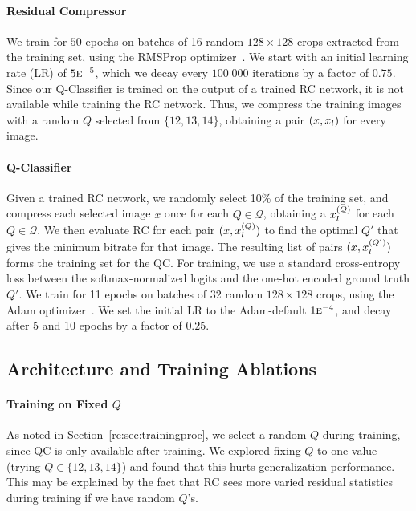 \paragraph{Residual Compressor}
We train for $50$ epochs on batches of 16 random $128{\times}128$ crops extracted from the training set, using the \mbox{RMSProp} optimizer~\cite{hinton2012neural}. We start with an initial learning rate (LR) of $5\textsc{e}^{-5}$, which we decay every $100\;000$ iterations by a factor of $0.75$. 
Since our Q-Classifier is trained on the output of a trained RC network, it is not available while training the RC network. Thus, we compress the training images with a random $Q$ selected from $\{12, 13, 14\}$, obtaining a pair $(x, x_l)$ for every image.

\paragraph{Q-Classifier}
Given a trained RC network, we randomly select 10\% of the training set, and compress each selected image $x$ once for each $Q \in \mathcal{Q}$, obtaining a $x_l^{(Q)}$ for each $Q\in\mathcal{Q}$. We then evaluate RC for each pair $(x, x_l^{(Q)})$ to find the optimal $Q'$ that gives the minimum bitrate for that image.
The resulting list of pairs $(x, x_l^{(Q')})$ forms the training set for the QC. 
For training, we use a standard cross-entropy loss between the softmax-normalized logits and the one-hot encoded ground truth $Q'$. We train for 11 epochs on batches of 32 random $128{\times}128$ crops, using the Adam optimizer~\cite{kingma2014adam}. We set the initial LR to the Adam-default $1\textsc{e}^{-4}$, and decay after 5 and 10 epochs by a factor of $0.25$. 

\subsection{Architecture and Training Ablations}


\paragraph{Training on Fixed $Q$}
As noted in Section~\ref{rc:sec:trainingproc}, we select a random $Q$ during training, since QC is only available after training. We explored fixing $Q$ to one value (trying $Q \in \{12, 13, 14\}$) and found that this hurts generalization performance. This may be explained by the fact that RC sees more varied residual statistics during training if we have random $Q$'s.

